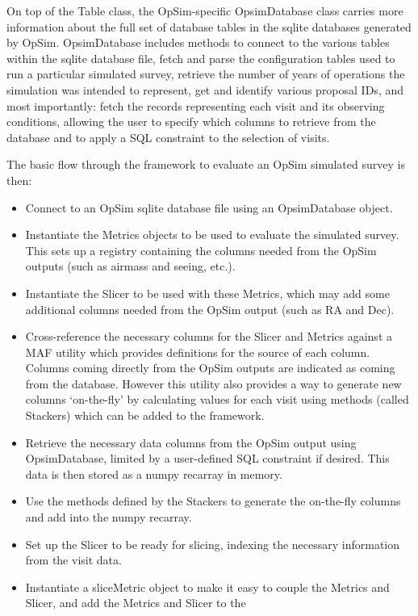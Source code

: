 \documentclass[]{spie}  %
\begin{document}
On top of the Table class, the OpSim-specific OpsimDatabase class
carries more information about the full set of database tables in the
sqlite databases generated by OpSim. OpsimDatabase includes methods to
connect to the various tables within the sqlite database file, fetch
and parse the configuration tables used to run a particular simulated
survey, retrieve the number of years of operations the simulation was
intended to represent, get and identify various proposal IDs, and most
importantly: fetch the records representing each visit and its
observing conditions, allowing the user to specify which columns to
retrieve from the database and to apply a SQL constraint to the selection
of visits. 

The basic flow through the framework to evaluate an OpSim simulated survey is then:
\begin{itemize}
\item{Connect to an OpSim sqlite database file using an OpsimDatabase
object.}
\item{Instantiate the Metrics objects to be used to evaluate the
simulated survey. This sets up a registry containing the columns
needed from the OpSim outputs (such as airmass and seeing, etc.).}
\item{Instantiate the Slicer to be used with these Metrics, which may
add some additional columns needed from the OpSim output (such as RA
and Dec).}
\item{Cross-reference the necessary columns for the Slicer and Metrics
against a MAF utility which provides definitions for the source of
each column. Columns coming directly from the OpSim outputs are
indicated as coming from the database. However this utility also
provides a way to generate new columns `on-the-fly' by calculating
values for each visit using methods (called Stackers) which can be
added to the framework.}
\item{Retrieve the necessary data columns from the OpSim output using
OpsimDatabase, limited by a user-defined SQL constraint if
desired. This data is then stored as a numpy recarray in memory.}
\item{Use the methods defined by the Stackers to generate the
on-the-fly columns and add into the numpy recarray.}
\item{Set up the Slicer to be ready for slicing, indexing the
necessary information from the visit data.}
\item{Instantiate a sliceMetric object to make it easy to couple the
Metrics and Slicer, and add the Metrics and Slicer to the
}
\end{itemize}
\end{document}

